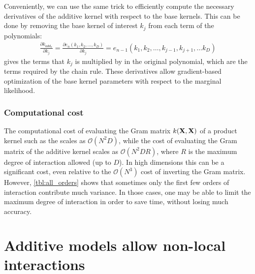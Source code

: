 Conveniently, we can use the same trick to efficiently compute the necessary derivatives of the additive kernel with respect to the base kernels.
This can be done by removing the base kernel of interest $k_j$ from each term of the polynomials:
%
\begin{align}
\frac{\partial k_{add_n}}{\partial k_j} = 
\frac{\partial e_{n}(k_1,k_2,\dots, k_D)}{\partial k_j} = 
e_{n-1}(k_1, k_2, \dots,k_{j-1},k_{j+1}, \dots k_D)
\label{eq:additive-derivatives}
\end{align}
%
 gives the terms that $k_j$ is multiplied by in the original polynomial, which are the terms required by the chain rule.
These derivatives allow gradient-based optimization of the base kernel parameters with respect to the marginal likelihood.




\subsubsection{Computational cost}
The computational cost of evaluating the Gram matrix $k(\mathbf{X}, \mathbf{X})$ of a product kernel such as the \seard{} scales as $\mathcal{O}(N^2D)$, while the cost of evaluating the Gram matrix of the additive kernel scales as $\mathcal{O}(N^2DR)$, where $R$ is the maximum degree of interaction allowed (up to $D$).
In high dimensions this can be a significant cost, even relative to the $\mathcal{O}(N^3)$ cost of inverting the Gram matrix.
However, \cref{tbl:all_orders} shows that sometimes only the first few orders of interaction contribute much variance.
In those cases, one may be able to limit the maximum degree of interaction in order to save time, without losing much accuracy.



\section{Additive models allow non-local interactions}

